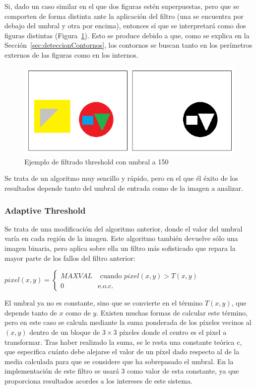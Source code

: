 {	Si, dado un caso similar en el que dos figuras estén superpuestas, pero que se comporten de forma distinta ante la aplicación del filtro (una se encuentra por debajo del umbral y otra por encima), entonces sí que se interpretará como dos figuras distintas (Figura~\ref{fig:threshold2}). Esto se produce debido a que, como se explica en la Sección~\ref{sec:deteccionContornos}, los contornos se buscan tanto en los perímetros externos de las figuras como en los internos.
	
		\begin{figure}[!htbp]
		\centering
		\includegraphics[scale=0.47]{graphics/threshold2.png}
		\caption{Ejemplo de filtrado threshold con umbral a 150}
		\label{fig:threshold2}
		\end{figure}
		
	Se trata de un algoritmo muy sencillo y rápido, pero en el que él éxito de los resultados depende tanto del umbral de entrada como de la imagen a analizar.
		
	\subsubsection{Adaptive Threshold}
	
	Se trata de una modificación del algoritmo anterior, donde el valor del umbral varía en cada región de la imagen. Este algoritmo también devuelve sólo una imagen binaria, pero aplica sobre ella un filtro más sofisticado que repara la mayor parte de los fallos del filtro anterior:

	\begin{center}
		$pixel(x,y) = \left\{
		\begin{array}{cc}
		MAXVAL 	& \text{ cuando } pixel(x,y) > T(x,y)\\ 
		0 	    & 	\text{e.o.c.}
		\end{array}\right.$
	\end{center}
	
	El umbral ya no es constante, sino que se convierte en el término $T(x,y)$, que depende tanto de $x$ como de $y$. Existen muchas formas de calcular este término, pero en este caso se calcula mediante la suma ponderada de los píxeles vecinos al $(x,y)$ dentro de un bloque de $3\times3$ píxeles donde el centro es el pixel a transformar. Tras haber realizado la suma, se le resta una constante teórica c, que especifica cuánto debe alejarse el valor de un píxel dado respecto al de la media calculada para que se considere que ha sobrepasado el umbral. En la implementación de este filtro se usará 3 como valor de esta constante, ya que proporciona resultados acordes a los intereses de este sistema.
	
}
